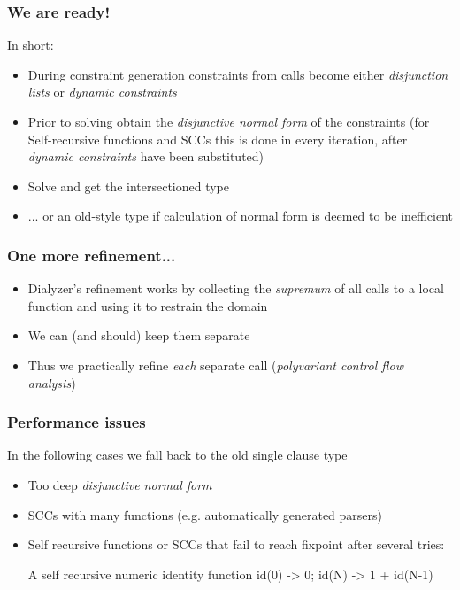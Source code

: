 \documentclass{beamer}
\begin{document}
\begin{frame}
  \frametitle{We are ready!}
  In short: \pause
  \begin{itemize}
  \item During constraint generation constraints from calls become
    either \emph{disjunction lists} or \emph{dynamic constraints} \pause
  \item Prior to solving obtain the \emph{disjunctive normal form} of
    the constraints (for Self-recursive functions and SCCs this is
    done in every iteration, after \emph{dynamic constraints} have
    been substituted) \pause
  \item Solve and get the intersectioned type \pause
  \item ... or an old-style type if calculation of normal form is
    deemed to be inefficient
  \end{itemize}
\end{frame}

\begin{frame}
  \frametitle{One more refinement...}
  \begin{itemize}
  \item Dialyzer's refinement works by collecting the
    \emph{supremum} of all calls to a local function and
    using it to restrain the domain \pause
  \item We can (and should) keep them separate
  \item Thus we practically refine \emph{each} separate
    call (\emph{polyvariant control flow analysis})
  \end{itemize}
\end{frame}

\begin{frame}[fragile]
  \frametitle{Performance issues}
  In the following cases we fall back to the old single clause type
  \begin{itemize}
    \item Too deep \emph{disjunctive normal form}
    \item SCCs with many functions (e.g. automatically generated
      parsers)
    \item Self recursive functions or SCCs that fail to reach fixpoint
      after several tries:
\begin{code}{A self recursive numeric identity function}
    id(0) -> 0; id(N) -> 1 + id(N-1)
\end{code}
  \end{itemize}
\end{frame}
\end{document}
